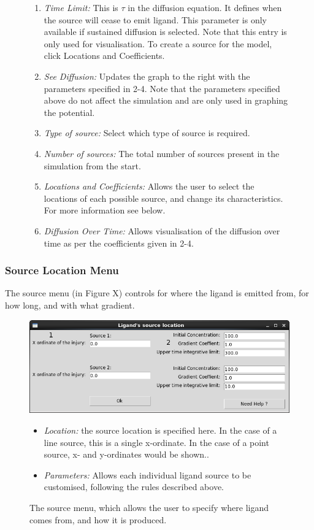 \documentclass[12pt]{article}
\begin{document}
\begin{figure}[H]
{\begin{enumerate}[topsep=2pt,itemsep=-1ex,partopsep=1ex,parsep=1ex]
  only modifies the visualisation plot and does not affect the simulation.
\item {\itshape Time Limit:} This is \(\tau\) in the diffusion equation. 
  It defines when the source will cease to emit ligand. This parameter 
  is only available if sustained diffusion is selected. Note that this 
  entry is only used for visualisation. To create a source for the model,
  click Locations and Coefficients.
  \item {\itshape See Diffusion:} Updates the graph to the right with the 
  parameters specified in 2-4. Note that the parameters specified above do 
  not affect the simulation and are only used in graphing the potential.
  \item {\itshape Type of source:} Select which type of source is 
  required.
  \item {\itshape Number of sources: }The total number of sources present 
  in the simulation from the start.
  \item {\itshape Locations and Coefficients: }Allows the user to select 
  the locations of each possible source, and change its characteristics. 
  For more information see below.
  \item {\itshape Diffusion Over Time:} Allows visualisation of the 
  diffusion over time as per the coefficients given in 2-4.
\end{enumerate}
}
\end{figure}

\subsubsection{Source Location Menu}
The source menu (in Figure X) controls for where the ligand is emitted 
from, for how long, and with what gradient.

\begin{figure}[H]
\centering
\includegraphics[width=13.51cm]{media/source_loc_screen_annotated.png}
\caption[]{The source menu, which allows the user to specify 
where ligand comes from, and how it is produced.}
\begin{itemize}
\item {\itshape Location: }the source location is specified here. In the 
case of a line source, this is a single x-ordinate. In the case of a 
point source, x- and y-ordinates would be shown..
\item {\itshape Parameters: }Allows each individual ligand source to be 
customised, following the rules described above.
\end{itemize}
\end{figure}
\end{document}
